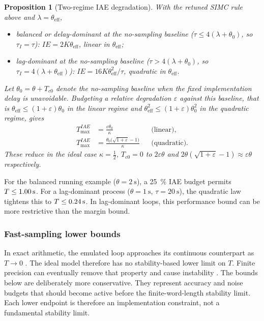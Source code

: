 \documentclass[a4paper,fleqn]{cas-sc}
\newtheorem{proposition}{Proposition}
\theoremstyle{remark}
\newcommand{\thetaeff}{\theta_{\mathrm{eff}}}
\newcommand{\Tmax}{T_{\max}}
\begin{document}
\begin{proposition}[Two-regime IAE degradation]
\label{prop:iae}
With the retuned SIMC rule above and $\lambda=\thetaeff$,
\begin{itemize}
\item balanced or delay-dominant at the no-sampling baseline
($\tau\le4(\lambda+\theta_0)$, so
$\tau_I=\tau$): $IE=2K\thetaeff$, linear in $\thetaeff$;
\item lag-dominant at the no-sampling baseline
($\tau>4(\lambda+\theta_0)$, so
$\tau_I=4(\lambda+\thetaeff)$):
$IE=16K\thetaeff^2/\tau$, quadratic in $\thetaeff$.
\end{itemize}
Let $\theta_0=\theta+T_{c0}$ denote the no-sampling baseline when the fixed
implementation delay is unavoidable. Budgeting a relative degradation
$\varepsilon$ against this baseline, that is
$\thetaeff\le(1+\varepsilon)\theta_0$ in the linear regime and
$\thetaeff^2\le(1+\varepsilon)\theta_0^2$ in the quadratic regime, gives
\begin{equation}
\begin{aligned}
\Tmax^{IAE}&=\frac{\varepsilon\theta_0}{\kappa}
&&\text{(linear)},\\
\Tmax^{IAE}&=\frac{\theta_0\bigl(\sqrt{1+\varepsilon}-1\bigr)}{\kappa}
&&\text{(quadratic)}.
\end{aligned}
\label{eq:iaemax}
\end{equation}
These reduce in the ideal case $\kappa=\tfrac12$, $T_{c0}=0$ to
$2\varepsilon\theta$ and $2\theta(\sqrt{1+\varepsilon}-1)\approx
\varepsilon\theta$ respectively.
\end{proposition}

For the balanced running example ($\theta=\SI{2}{\second}$), a
\SI{25}{\percent} IAE budget permits $T\le\SI{1.00}{\second}$. For a
lag-dominant process ($\theta=\SI{1}{\second}$, $\tau=\SI{20}{\second}$), the
quadratic law tightens this to $T\le\SI{0.24}{\second}$. In lag-dominant
loops, this performance bound can be more restrictive than the margin bound.

\subsubsection{Fast-sampling lower bounds}
\label{sec:foptdlower}
In exact arithmetic, the emulated loop approaches its continuous counterpart as $T\to0$ \citep{chen1995optimal,astrom1997computer}. The ideal model therefore has no stability-based lower limit on $T$. Finite precision can eventually remove that property and cause instability \citep{fialho1994wordlength,gessing2001fwl}. The bounds below are deliberately more conservative. They represent accuracy and noise budgets that should become active before the finite-word-length stability limit. Each lower endpoint is therefore an implementation constraint, not a fundamental stability limit.
\end{document}
